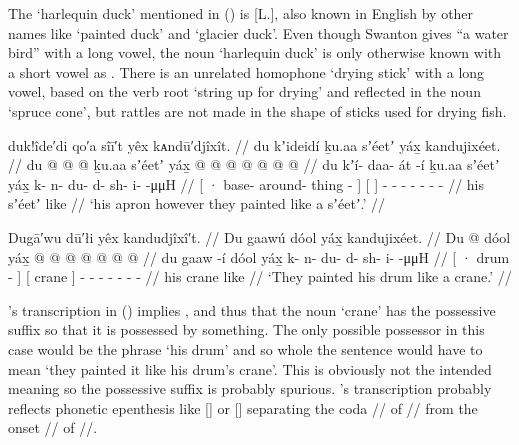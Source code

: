 The  ‘harlequin duck’ mentioned in (\nextx) is [L.], also known in English by other names like ‘painted duck’ and ‘glacier duck’.
Even though Swanton gives  “a water bird” with a long vowel, the noun ‘harlequin duck’ is only otherwise known with a short vowel as  \parencites[09/282]{leer:1973}[43]{leer:1978b}[\textsc{m}·137]{leer:2001}.
There is an unrelated homophone  ‘drying stick’ with a long vowel, based on the verb root  ‘string up for drying’ and reflected in the noun  ‘spruce cone’, but rattles are not made in the shape of sticks used for drying fish.

\ex\label{ex:100-184-apron-seet}%
%
\begingl
	\glpreamble	duk!îde′di qo′a sîī′t yêx kᴀndū′djîxît. //
	\glpreamble	du kʼideidí ḵu.aa sʼéetʼ yáx̱ kandujixéet. //
	\gla	{} du  @ {} @ {} @ {}  {} ḵu.aa
		{} sʼéetʼ yáx̱ {}
		 @ {} @ {} @ {} @ {} @ {} @ {} @ {} //
	\glb	{} du kʼí- daa- át -í {} ḵu.aa
		{} sʼéetʼ yáx̱ {}
		k- n- du- d- sh- i-  -μμH //
	\glc	{}[ · base- around- thing - {}] 
		{}[   {}]
		- - - - - -  - //
	\gld	{} his  {} {} {} {} 
		{} sʼéetʼ like {}
		 {} {} {} {} {} {} {} // 
	\glft	‘his apron however they painted like a sʼéetʼ.’
		//
\endgl
\xe

\ex\label{ex:100-185-drum-crane}%
%
\begingl
	\glpreamble	Dugā′wu dū′łi yêx kandudjîxî′t. //
	\glpreamble	Du gaawú dóol yáx̱ kandujixéet. //
	\gla	{} Du  @ {} {} 
		{} dóol yáx̱ {}
		 @ {} @ {} @ {} @ {} @ {} @ {} @ {} //
	\glb	{} du gaaw -í {}
		{} dóol yáx̱ {}
		k- n- du- d- sh- i-  -μμH //
	\glc	{}[ · drum - {}]
		{}[ crane  {}]
		- - - - - -  - //
	\gld	{} his  {} {}
		{} crane like {}
		 {} {} {} {} {} {} {} // 
	\glft	‘They painted his drum like a crane.’
		//
\endgl
\xe

\citeauthor{swanton:1909}’s transcription  in (\lastx) implies , and thus that the noun  ‘crane’ has the possessive suffix  so that it is possessed by something.
The only possible possessor in this case would be the phrase  ‘his drum’ and so whole the sentence would have to mean ‘they painted it like his drum’s crane’.
This is obviously not the intended meaning so the possessive suffix is probably spurious.
\citeauthor{swanton:1909}’s transcription probably reflects phonetic epenthesis like [] or [] separating the coda // of // from the onset // of //.

